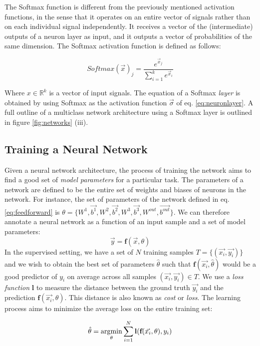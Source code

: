 The Softmax function is different from the previously mentioned activation functions, in the sense that it operates on an entire vector of signals rather than on each individual signal independently. It receives a vector of the (intermediate) outputs of a neuron layer as input, and it outputs a vector of probabilities of the same dimension. The Softmax activation function is defined as follows:

\begin{equation}
    Softmax( \vec{x} )_j = \frac{e^{\vec{x}_j}}{\sum_{i=1}^k e^{\vec{x}_i}}
    \label{eq:softmax}
\end{equation}

Where $x \in \mathbb{R}^k$ is a vector of input signals. The equation of a Softmax \emph{layer} is obtained by using Softmax as the activation function \(\vec{\sigma}\) of eq.  \ref{eq:neuronlayer}. A full outline of a multiclass network architecture using a Softmax layer is outlined in figure \ref{fig:networks} (iii).

\subsection{Training a Neural Network}
Given a neural network architecture, the process of training the network aims to find a good set of \emph{model parameters} for a particular task. The parameters of a network are defined to be the entire set of weights and biases of neurons in the network. For instance, the set of parameters of the network defined in eq. \ref{eq:feedforward} is $\theta = \{W^1, \vec{b^1}, W^2, \vec{b^2}, W^3, \vec{b^3}, W^{out}, \vec{b^{out}}\}$. We can therefore annotate a neural network as a function of an input sample and a set of model parameters: 
$$ \vec{y} = \textbf{f}(\vec{x}, \theta) $$ 
In the supervised setting, we have a set of $N$ training samples $T = \{(\vec{x_i}, \vec{y_i})\}$ and we wish to obtain the best set of parameters $\hat{\theta}$ such that $\textbf{f}(\vec{x_i}, \hat{\theta})$ would be a good predictor of $y_i$ on average across all samples $(\vec{x_i}, \vec{y_i}) \in T$.  We use a \emph{loss function} $\textbf{l}$ to measure the distance between the ground truth $\vec{y_i}$ and the prediction $\textbf{f}(\vec{x_i}, \theta)$. This distance is also known as \emph{cost} or \emph{loss}. The learning process aims to minimize the average loss on the entire training set:

\begin{equation}
\hat{\theta} = \operatorname*{\arg\!\min}_{\theta} \sum_{i=1}^N \textbf{l}(\textbf{f}(\vec{x_i}, \theta), y_i)
\label{eq:bestparams}    
\end{equation}



